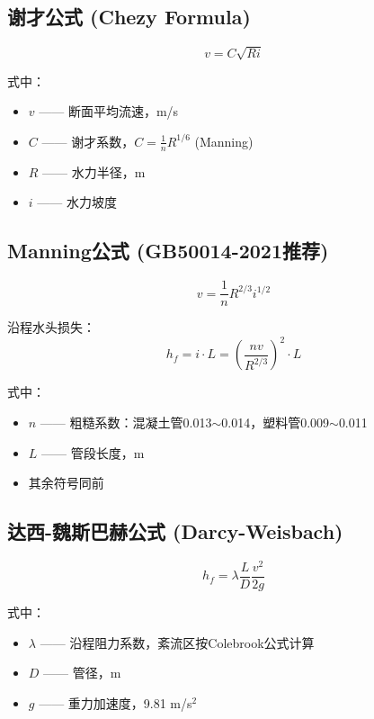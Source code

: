 \documentclass[12pt,a4paper]{ctexart}
\begin{document}
\subsection{谢才公式 (Chezy Formula)}

\begin{equation}
    v = C \sqrt{R i}
    \label{eq:chezy}
\end{equation}

式中：
\begin{itemize}[nosep]
    \item $v$ —— 断面平均流速，m/s
    \item $C$ —— 谢才系数，$C = \frac{1}{n} R^{1/6}$ (Manning)
    \item $R$ —— 水力半径，m
    \item $i$ —— 水力坡度
\end{itemize}

\subsection{Manning公式 (GB50014-2021推荐)}

\begin{equation}
    v = \frac{1}{n} R^{2/3} i^{1/2}
    \label{eq:manning}
\end{equation}

沿程水头损失：
\begin{equation}
    h_f = i \cdot L = \left( \frac{n v}{R^{2/3}} \right)^2 \cdot L
    \label{eq:hf}
\end{equation}

式中：
\begin{itemize}[nosep]
    \item $n$ —— 粗糙系数：混凝土管0.013$\sim$0.014，塑料管0.009$\sim$0.011
    \item $L$ —— 管段长度，m
    \item 其余符号同前
\end{itemize}

\subsection{达西-魏斯巴赫公式 (Darcy-Weisbach)}

\begin{equation}
    h_f = \lambda \frac{L}{D} \frac{v^2}{2g}
    \label{eq:dw}
\end{equation}

式中：
\begin{itemize}[nosep]
    \item $\lambda$ —— 沿程阻力系数，紊流区按Colebrook公式计算
    \item $D$ —— 管径，m
    \item $g$ —— 重力加速度，9.81 m/s$^2$
\end{itemize}
\end{document}
